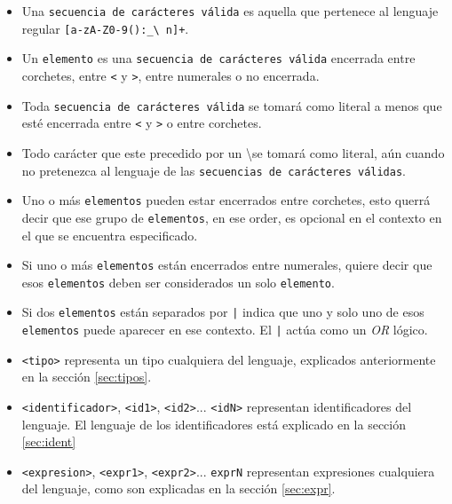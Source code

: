 \documentclass[12pt, spanish]{report}
\begin{document}
\begin{itemize}

\item Una \texttt{secuencia de car\'acteres v\'alida} es aquella que
  pertenece al lenguaje regular \texttt{[a-zA-Z0-9():\_\textbackslash
    n]+}.
       
\item Un \texttt{elemento} es una \texttt{secuencia de car\'acteres
    v\'alida} encerrada entre corchetes, entre \texttt{<} y
  \texttt{>}, entre numerales o no encerrada.
       
\item Toda \texttt{secuencia de car\'acteres v\'alida} se tomar\'a
  como literal a menos que est\'e encerrada entre \texttt{<} y
  \texttt{>} o entre corchetes.

\item Todo car\'acter que este precedido por un \textbackslash se
  tomar\'a como literal, a\'un cuando no pretenezca al lenguaje de las
  \texttt{secuencias de car\'acteres v\'alidas}.
       
\item Uno o m\'as \texttt{elementos} pueden estar encerrados entre
  corchetes, esto querr\'a decir que ese grupo de \texttt{elementos},
  en ese order, es opcional en el contexto en el que se encuentra
  especificado.
       
\item Si uno o m\'as \texttt{elementos} est\'an encerrados entre
  numerales, quiere decir que esos \texttt{elementos} deben ser
  considerados un solo \texttt{elemento}.
       
\item Si dos \texttt{elementos} est\'an separados por \texttt{|}
  indica que uno y solo uno de esos \texttt{elementos} puede aparecer
  en ese contexto. El \texttt{|} act\'ua como un \emph{OR} l\'ogico.
       
\item \texttt{<tipo>} representa un tipo cualquiera del lenguaje,
  explicados anteriormente en la secci\'on \ref{sec:tipos}.
       
\item \texttt{<identificador>}, \texttt{<id1>}, \texttt{<id2>}...
  \texttt{<idN>} representan identificadores del lenguaje. El lenguaje
  de los identificadores est\'a explicado en la secci\'on
  \ref{sec:ident}
       
\item \texttt{<expresion>}, \texttt{<expr1>}, \texttt{<expr2>}...
  \texttt{exprN} representan expresiones cualquiera del lenguaje, como
  son explicadas en la secci\'on \ref{sec:expr}.


\end{itemize}
\end{document}
